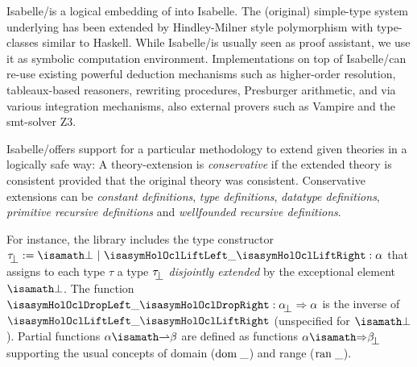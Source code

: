 Isabelle/\HOL is a logical embedding of \HOL into Isabelle.  The
(original) simple-type system underlying \HOL has been extended by
Hindley-Milner style polymorphism with type-classes similar to
Haskell.  While Isabelle/\HOL is usually seen as proof assistant, we
use it as symbolic computation environment. Implementations on top of
Isabelle/\HOL can re-use existing powerful deduction mechanisms such
as higher-order resolution, tableaux-based reasoners, rewriting
procedures, Presburger arithmetic, and via various integration
mechanisms, also external provers such as Vampire and the
\acs{smt}-solver Z3.

Isabelle/\HOL offers support for a particular methodology to extend
given theories in a logically safe way: A theory-extension is
\emph{conservative} if the extended theory is consistent provided that
the original theory was consistent.  Conservative extensions can be
\emph{constant definitions}, \emph{type definitions}, \emph{datatype
  definitions}, \emph{primitive recursive definitions} and
\emph{wellfounded recursive definitions}.

For instance, the library includes the type constructor $\up{\tau} :=
\isasymbottom ~ | ~ \lift{\_} : \alpha$ that assigns to each type
$\tau$ a type $\up{\tau}$ \emph{disjointly extended} by the
exceptional element $\isasymbottom$. The
function $\drop{\_} : \up{\alpha} \to \alpha$ is the inverse of
$\lift{\_}$ (unspecified for $\isasymbottom$). Partial functions
$\alpha \isasymrightharpoonup \beta$ are defined as functions $\alpha
\isasymRightarrow \up{\beta}$ supporting the usual concepts of domain
($\mathrm{dom}\;\_$) and range ($\mathrm{ran}\;\_$).

